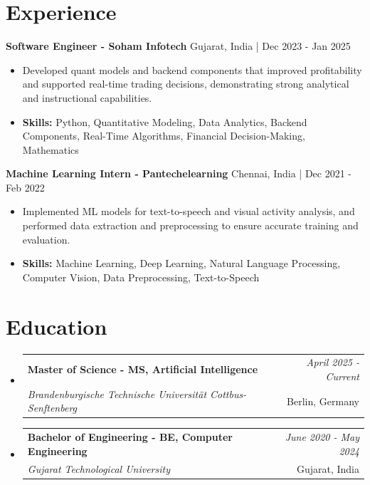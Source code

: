 \documentclass[a4paper,11pt]{article}
\makeatletter
\newcommand{\resumeSubheading}[4]{
\vspace{0.5mm}\item
    \begin{tabular*}{\linewidth}[t]{l@{\extracolsep{\fill}}r}
        \textbf{#1} & \textit{\footnotesize{#4}} \\
        \textit{\footnotesize{#3}} &  \footnotesize{#2}\\
    \end{tabular*}
    \vspace{-2.4mm}
}
\makeatother
\begin{document}
\section{\textbf{Experience}}


\vspace{1mm}
  \textbf{Software Engineer - Soham Infotech} \hfill Gujarat, India | Dec 2023 - Jan 2025
\vspace{-1.5mm} %
\begin{itemize}
  \item Developed quant models and backend components that improved profitability and supported real-time trading decisions, demonstrating strong analytical and instructional capabilities.

\vspace{-2mm}
  \item \textbf{Skills:} Python, Quantitative Modeling, Data Analytics, Backend Components, Real-Time Algorithms, Financial Decision-Making, Mathematics
\end{itemize}

\vspace{1mm}
  \textbf{Machine Learning Intern - Pantechelearning} \hfill Chennai, India | Dec 2021 - Feb 2022
\vspace{-1.5mm} %
\begin{itemize}
  \item Implemented ML models for text-to-speech and visual activity analysis, and performed data extraction and preprocessing to ensure accurate training and evaluation.
\vspace{-2mm}
  \item \textbf{Skills:} Machine Learning, Deep Learning, Natural Language Processing, Computer Vision, Data Preprocessing, Text-to-Speech
\end{itemize}\section{\textbf{Education}}
\vspace{-0.4mm}

\begin{itemize}[leftmargin=0.15in, label={}]
\resumeSubheading
{Master of Science - MS, Artificial Intelligence }{Berlin, Germany}
{Brandenburgische Technische Universität Cottbus-Senftenberg  }{April 2025 - Current}

\vspace{1.0mm} %
\resumeSubheading
{Bachelor of Engineering - BE, Computer Engineering  }{Gujarat, India}
{Gujarat Technological University }{June 2020 - May 2024}

\end{itemize}
\end{document}
